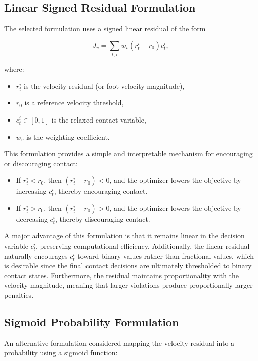 \documentclass[conference]{IEEEtran}
\begin{document}
\subsection{Linear Signed Residual Formulation}

The selected formulation uses a signed linear residual of the form

\[
J_v
=
\sum_{t,i}
w_v
\left(r_t^i - r_0\right)
c_t^i,
\]

where:
\begin{itemize}
    \item $r_t^i$ is the velocity residual (or foot velocity magnitude),
    \item $r_0$ is a reference velocity threshold,
    \item $c_t^i \in [0,1]$ is the relaxed contact variable,
    \item $w_v$ is the weighting coefficient.
\end{itemize}

This formulation provides a simple and interpretable mechanism for encouraging or discouraging contact:

\begin{itemize}
    \item If $r_t^i < r_0$, then $(r_t^i-r_0) < 0$, and the optimizer lowers the objective by increasing $c_t^i$, thereby encouraging contact.
    
    \item If $r_t^i > r_0$, then $(r_t^i-r_0) > 0$, and the optimizer lowers the objective by decreasing $c_t^i$, thereby discouraging contact.
\end{itemize}

A major advantage of this formulation is that it remains linear in the decision variable $c_t^i$, preserving computational efficiency. Additionally, the linear residual naturally encourages $c_t^i$ toward binary values rather than fractional values, which is desirable since the final contact decisions are ultimately thresholded to binary contact states. Furthermore, the residual maintains proportionality with the velocity magnitude, meaning that larger violations produce proportionally larger penalties.


\subsection{Sigmoid Probability Formulation}

An alternative formulation considered mapping the velocity residual into a probability using a sigmoid function:
\end{document}
